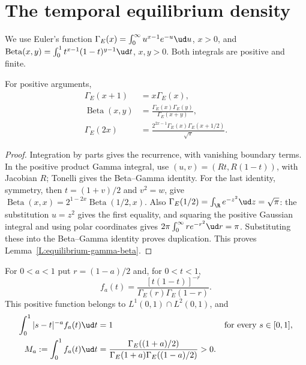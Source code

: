 \section{The temporal equilibrium density}
\label{S:temporal-equilibrium}

We use Euler's function
$\Gamma_E(x)=\int_0^\infty u^{x-1}e^{-u}\ud u$, $x>0$,
and $\operatorname{Beta}(x,y)=\int_0^1t^{x-1}(1-t)^{y-1}\ud t$,
$x,y>0$. Both integrals are positive and finite.

\begin{lemma}\label{L:equilibrium-gamma-beta}
  For positive arguments,
  \begin{align*}
    \Gamma_E(x+1)&=x\Gamma_E(x),\\
    \operatorname{Beta}(x,y)
    &=\frac{\Gamma_E(x)\Gamma_E(y)}{\Gamma_E(x+y)},\\
    \Gamma_E(2x)
    &=\frac{2^{2x-1}\Gamma_E(x)\Gamma_E(x+1/2)}{\sqrt\pi}.
  \end{align*}
\end{lemma}

\begin{proof}
  Integration by parts gives the recurrence, with vanishing boundary
  terms. In the positive product Gamma integral, use
  $(u,v)=(Rt,R(1-t))$, with Jacobian $R$; Tonelli gives the
  Beta--Gamma identity. For the last identity, symmetry, then
  $t=(1+v)/2$ and $v^2=w$, give
  $\operatorname{Beta}(x,x)=2^{1-2x}\operatorname{Beta}(1/2,x)$.
  Also $\Gamma_E(1/2)=\int_\R e^{-z^2}\ud z=\sqrt\pi$:
  the substitution $u=z^2$ gives the first equality, and squaring
  the positive Gaussian integral and using polar coordinates gives
  $2\pi\int_0^\infty re^{-r^2}\ud r=\pi$.
  Substituting these into the Beta--Gamma identity proves duplication.
  This proves Lemma~\ref{L:equilibrium-gamma-beta}.
\end{proof}

\begin{lemma}\label{L:temporal-equilibrium}
  For $0<a<1$ put $r=(1-a)/2$ and, for $0<t<1$,
  \begin{equation}\label{E:temporal-equilibrium-density}
    f_a(t)=\frac{[t(1-t)]^{-r}}{\Gamma_E(r)\Gamma_E(1-r)}.
  \end{equation}
  This positive function belongs to $L^1(0,1)\cap L^2(0,1)$, and
  \begin{align}
    \int_0^1|s-t|^{-a}f_a(t)\ud t&=1
    &&\text{for every }s\in[0,1],\label{E:temporal-equilibrium-potential}\\
    M_a:=\int_0^1f_a(t)\ud t
    &=\frac{\Gamma_E((1+a)/2)}
    {\Gamma_E(1+a)\Gamma_E((1-a)/2)}>0.
    \label{E:temporal-equilibrium-mass}
  \end{align}
\end{lemma}

